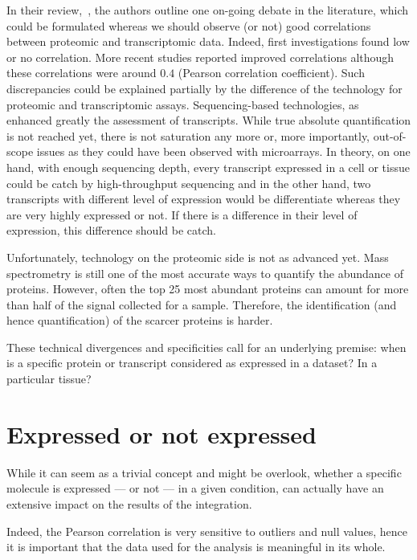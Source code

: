 In their review,~\cite{Uhlen:2016}, the authors outline one on-going debate
in the literature, which could be formulated whereas we should observe (or not)
good correlations between proteomic and transcriptomic data.
Indeed, first investigations found low or no correlation. More recent
studies reported improved correlations although these correlations were around
$0.4$ (Pearson correlation coefficient). Such discrepancies could be explained
partially by the difference of the technology for proteomic and transcriptomic
assays. Sequencing-based technologies, as \Rnaseq\, enhanced greatly the
assessment of transcripts. While true absolute quantification is not reached yet,
there is not saturation any more or, more importantly, out-of-scope issues as
they could have been observed with microarrays. In theory, on one hand, with
enough sequencing depth, every transcript expressed in a cell or tissue could be
catch by high-throughput sequencing and in the other hand, two transcripts with
different level of expression would be differentiate whereas they are very highly
expressed or not. If there is a difference in their level of expression, this
difference should be catch.

Unfortunately, technology on the proteomic side is not as advanced yet.
Mass spectrometry is still one of the most accurate ways to quantify the
abundance of proteins. However, often the top 25 most abundant proteins can
amount for more than half of the signal collected for a sample. Therefore, the
identification (and hence quantification) of the scarcer proteins is harder.


These technical divergences and specificities call for an underlying premise:
when is a specific protein or transcript considered as expressed in a dataset?
In a particular tissue?

\section{Expressed or not expressed}
\label{sec:IntegrationExpressedOrNot}

While it can seem as a trivial concept and might be overlook, whether a specific
molecule is expressed --- or not --- in a given condition, can actually have
an extensive impact on the results of the integration.

Indeed, the Pearson correlation is very sensitive to outliers and null values,
hence it is important that the data used for the analysis is meaningful in
its whole.


